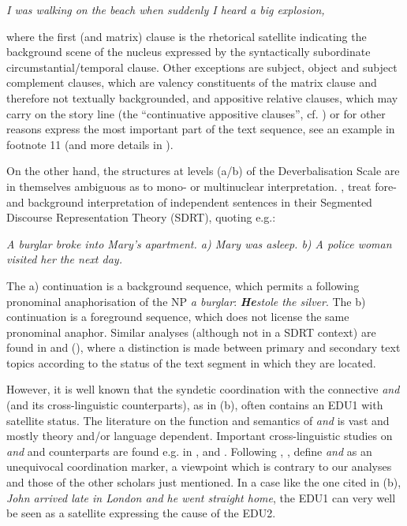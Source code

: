 \documentclass[output=paper]{LSP/langsci}
\begin{document}
\ea
\textit{I was walking on the beach when suddenly I heard a big explosion,}
\z

where the first (and matrix) clause is the rhetorical satellite indicating the background scene of the nucleus expressed by the syntactically subordinate circumstantial/temporal clause. Other exceptions are subject, object and subject complement clauses, which are valency constituents of the matrix clause and therefore not textually backgrounded, and appositive relative clauses, which may carry on the story line (the ``continuative appositive clauses'', cf. \citealt[95]{Loock2010}) or for other reasons express the most important part of the text sequence, see an example in footnote 11 (and more details in \citealt{Korzen2007b,Korzen2009}).

On the other hand, the structures at levels (a/b) of the Deverbalisation Scale are in themselves ambiguous as to mono- or multinuclear interpretation. \citet[165-168]{Asher2003}, treat fore- and background interpretation of independent sentences in their Segmented Discourse Representation Theory (SDRT), quoting e.g.: 

\ea\label{ex:korzen:7}
\textit{A burglar broke into Mary's apartment. a) Mary was asleep. b) A police woman visited her the next day.}
\z

The a) continuation is a background sequence, which permits a following pronominal anaphorisation of the NP \textit{a burglar}: \textbf{\textit{He}}\textit{stole the silver}. The b) continuation is a foreground sequence, which does not license the same pronominal anaphor. Similar analyses (although not in a SDRT context) are found in \citet[484-492]{Korzen2000} and (\citeyear[114]{Korzen2001}), where a distinction is made between primary and secondary text topics according to the status of the text segment in which they are located. 

However, it is well known that the syndetic coordination with the connective \textit{and} (and its cross-linguistic counterparts), as in (b), often contains an EDU1 with satellite status. The literature on the function and semantics of \textit{and} is vast and mostly theory and/or language dependent. Important cross-linguistic studies on \textit{and} and counterparts are found e.g. in \citet{Ramm2005}, \citet{Behrens2010} and \citet[652-660]{Skytte2000}. Following \citet{Txurruka2000}, \citet[598-599]{Asher2005}, define \textit{and} as an unequivocal coordination marker, a viewpoint which is contrary to our analyses and those of the other scholars just mentioned. In a case like the one cited in (b), \textit{John arrived late in London and he went straight home}, the EDU1 can very well be seen as a satellite expressing the cause of the EDU2.
\end{document}
